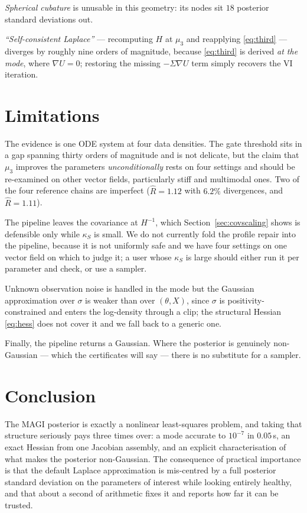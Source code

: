\documentclass[11pt]{article}
\newcommand{\Rhat}{\widehat{R}}
\theoremstyle{plain}
\theoremstyle{definition}
\theoremstyle{remark}
\begin{document}
\emph{Spherical cubature} is unusable in this geometry: its nodes sit $18$ posterior standard
deviations out.

\emph{``Self-consistent Laplace''} --- recomputing $H$ at $\mu_3$ and reapplying \eqref{eq:third} ---
diverges by roughly nine orders of magnitude, because \eqref{eq:third} is derived \emph{at the
mode}, where $\nabla U = 0$; restoring the missing $-\Sigma\nabla U$ term simply recovers the VI
iteration.

\section{Limitations}

The evidence is one ODE system at four data densities. The gate threshold sits in a gap spanning
thirty orders of magnitude and is not delicate, but the claim that $\mu_3$ improves the parameters
\emph{unconditionally} rests on four settings and should be re-examined on other vector fields,
particularly stiff and multimodal ones. Two of the four reference chains are imperfect ($\Rhat =
1.12$ with $6.2\%$ divergences, and $\Rhat = 1.11$).

The pipeline leaves the covariance at $H^{-1}$, which Section~\ref{sec:covscaling} shows is
defensible only while $\kappa_S$ is small. We do not currently fold the profile repair into the
pipeline, because it is not uniformly safe and we have four settings on one vector field on which
to judge it; a user whose $\kappa_S$ is large should either run it per parameter and check, or use
a sampler.

Unknown observation noise is handled in the mode but the Gaussian approximation over $\sigma$ is
weaker than over $(\theta,X)$, since $\sigma$ is positivity-constrained and enters the log-density
through a clip; the structural Hessian \eqref{eq:hess} does not cover it and we fall back to a
generic one.

Finally, the pipeline returns a Gaussian. Where the posterior is genuinely non-Gaussian --- which the
certificates will say --- there is no substitute for a sampler.

\section{Conclusion}

The MAGI posterior is exactly a nonlinear least-squares problem, and taking that structure seriously
pays three times over: a mode accurate to $10^{-7}$ in $0.05$\,s, an exact Hessian from one Jacobian
assembly, and an explicit characterisation of what makes the posterior non-Gaussian. The
consequence of practical importance is that the default Laplace approximation is mis-centred by a
full posterior standard deviation on the parameters of interest while looking entirely healthy, and
that about a second of arithmetic fixes it and reports how far it can be trusted.
\end{document}
